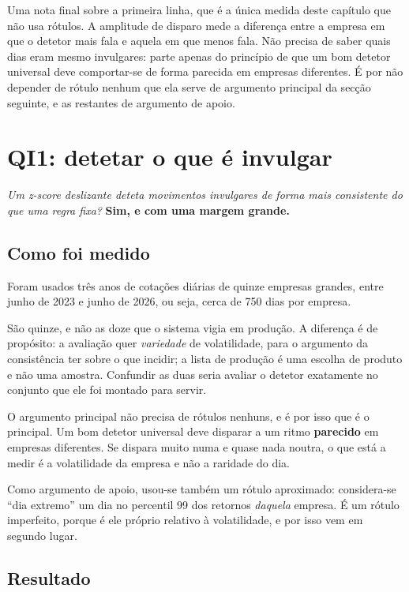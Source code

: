 Uma nota final sobre a primeira linha, que é a única medida deste capítulo que não usa rótulos. A
amplitude de disparo mede a diferença entre a empresa em que o detetor mais fala e aquela em que
menos fala. Não precisa de saber quais dias eram mesmo invulgares: parte apenas do princípio de que
um bom detetor universal deve comportar-se de forma parecida em empresas diferentes. É por não
depender de rótulo nenhum que ela serve de argumento principal da secção seguinte, e as restantes de
argumento de apoio.

\section{QI1: detetar o que é invulgar}
\label{sec:av_qi1}

\emph{Um \emph{z}-score deslizante deteta movimentos invulgares de forma mais consistente do que uma
regra fixa?} \textbf{Sim, e com uma margem grande.}

\subsection{Como foi medido}

Foram usados três anos de cotações diárias de quinze empresas grandes, entre junho de 2023 e junho de
2026, ou seja, cerca de 750 dias por empresa.

São quinze, e não as doze que o sistema vigia em produção. A diferença é de propósito: a avaliação
quer \emph{variedade} de volatilidade, para o argumento da consistência ter sobre o que incidir; a
lista de produção é uma escolha de produto e não uma amostra. Confundir as duas seria avaliar o
detetor exatamente no conjunto que ele foi montado para servir.

O argumento principal não precisa de rótulos nenhuns, e é por isso que é o principal. Um bom detetor
universal deve disparar a um ritmo \textbf{parecido} em empresas diferentes. Se dispara muito numa e
quase nada noutra, o que está a medir é a volatilidade da empresa e não a raridade do dia.

Como argumento de apoio, usou-se também um rótulo aproximado: considera-se ``dia extremo'' um dia no
percentil 99 dos retornos \emph{daquela} empresa. É um rótulo imperfeito, porque é ele próprio
relativo à volatilidade, e por isso vem em segundo lugar.

\subsection{Resultado}

